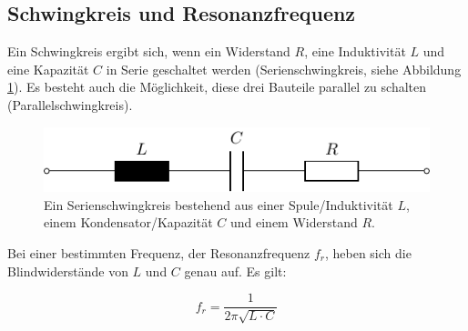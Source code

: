 \documentclass[twoside,a4paper,11pt,halfparskip,DIV=11,notitlepage]{scrartcl}
\begin{document}
\subsection{Schwingkreis und Resonanzfrequenz}
Ein Schwingkreis ergibt sich, wenn ein Widerstand $R$, eine Induktivität $L$
und eine Kapazität $C$ in Serie geschaltet werden (Serienschwingkreis, siehe
Abbildung \ref{fig:schwingkreis}). Es besteht auch die Möglichkeit, diese drei
Bauteile parallel zu schalten (Parallelschwingkreis).

\begin{figure}[H]
    \begin{center}
        \includegraphics{figures/tank_circuit/tank_circuit.pdf}
    \end{center}
    \caption{Ein Serienschwingkreis bestehend aus einer Spule/Induktivität $L$,
    einem Kondensator/Kapazität $C$ und einem Widerstand $R$.}
    \label{fig:schwingkreis}
\end{figure}

Bei einer bestimmten Frequenz, der Resonanzfrequenz $f_r$, heben sich die
Blindwiderstände von $L$ und $C$ genau auf. Es gilt:

$$
f_r = \frac{1}{2\pi\sqrt{L\cdot C}}
$$
\end{document}
